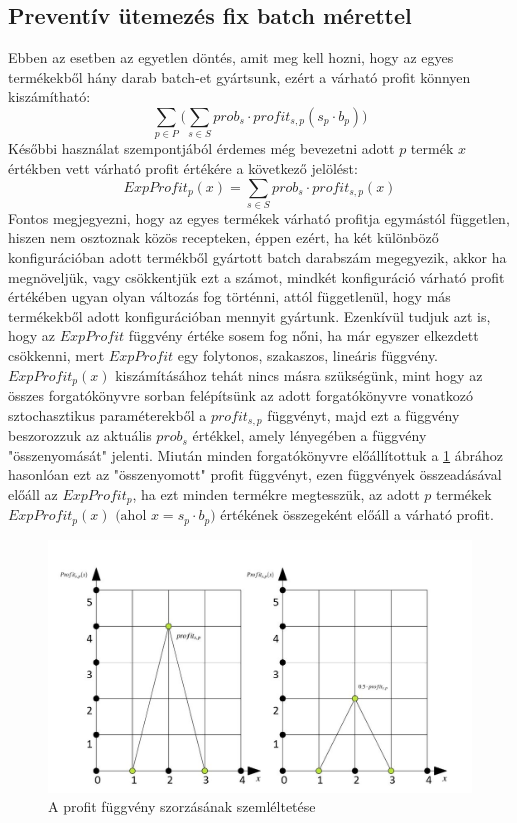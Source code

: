 \documentclass [12pt]{report}
\begin{document}
\subsection{Preventív ütemezés fix batch mérettel}
Ebben az esetben az egyetlen döntés, amit meg kell hozni, hogy az egyes termékekből hány darab batch-et gyártsunk, ezért a várható profit könnyen kiszámítható:
$$\sum_{p \in P}\bigg (\sum_{s \in S} prob_s \cdot profit_{s,p} (s_p \cdot b_p)\bigg)$$
Későbbi használat szempontjából érdemes még bevezetni adott $p$ termék $x$ értékben vett várható profit értékére a következő jelölést:
$$ExpProfit_p(x)=\sum_{s \in S}prob_s \cdot profit_{s,p}(x)$$
Fontos megjegyezni, hogy az egyes termékek várható profitja egymástól független, hiszen nem osztoznak közös recepteken, éppen ezért, ha két különböző konfigurációban adott termékből gyártott batch darabszám megegyezik, akkor ha megnöveljük, vagy csökkentjük ezt a számot, mindkét konfiguráció várható profit értékében ugyan olyan változás fog történni, attól függetlenül, hogy más termékekből adott konfigurációban mennyit gyártunk.
Ezenkívül tudjuk azt is, hogy az $ExpProfit$ függvény értéke sosem fog nőni, ha már egyszer elkezdett csökkenni, mert $ExpProfit$ egy folytonos, szakaszos, lineáris függvény. \cite{?}
$ExpProfit_p(x)$ kiszámításához tehát nincs másra szükségünk, mint hogy az összes forgatókönyvre sorban felépítsünk az adott forgatókönyvre vonatkozó sztochasztikus paraméterekből a $profit_{s,p}$ függvényt, majd ezt a függvény beszorozzuk az aktuális $prob_s$ értékkel, amely lényegében a függvény "összenyomását" jelenti. Miután minden forgatókönyvre előállítottuk a \ref{profit_func_prob} ábrához hasonlóan ezt az "összenyomott" profit függvényt, ezen függvények összeadásával előáll az $ExpProfit_p$, ha ezt minden termékre megtesszük, az adott $p$ termékek $ExpProfit_p(x) \text{ (ahol }x=s_p \cdot b_p)$ értékének összegeként előáll a várható profit.
\pagebreak
\begin{figure}
\begin{center}
\includegraphics[scale=0.5]{profit_func_prob}
\caption{A profit függvény szorzásának szemléltetése}
\label{profit_func_prob}
\end{center}
\end{figure}
\end{document}
